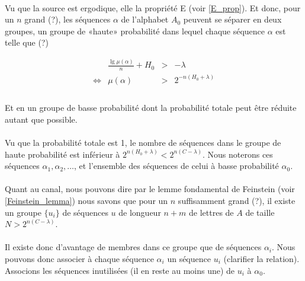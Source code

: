 \documentclass[a4paper,12pt]{article}
\begin{document}
	\paragraph{}
	Vu que la source est ergodique, elle la propriété E (voir \ref{E_prop}). Et donc, pour un $n$ grand (?), les séquences $\alpha$ de l'alphabet 
	$A_0$ peuvent se séparer en deux groupes, un groupe de «haute» probabilité dans lequel chaque séquence $\alpha$ est telle que (?)
	
	\[
		\begin{array}{crcl}
			&\frac{\lg \mu\left(\alpha\right)}{n}+H_0 &>& -\lambda\\
			\Leftrightarrow & \mu(\alpha) & > &2^{-n\left(H_0+\lambda\right)}\\
		\end{array}
	\]
	
	\paragraph{}
	Et en un groupe de basse probabilité dont la probabilité totale peut être réduite autant que possible.

	\paragraph{}
	Vu que la probabilité totale est 1, le nombre de séquences dans le groupe de haute probabilité est inférieur à $2^{n(H_0+\lambda)}<2^{n(C-\lambda)}$.
	Nous noterons ces séquences $\alpha_1,\alpha_2,\dots$, et l'ensemble des séquences de celui à basse probabilité $\alpha_0$.
	
	\paragraph{}
	Quant au canal, nous pouvons dire par le lemme fondamental de Feinstein (voir \ref{Feinstein_lemma}) nous savons que pour un $n$ suffisamment grand (?), 
	il existe un groupe $\{u_i\}$ de séquences $u$ de longueur $n+m$ de lettres de $A$ de taille $N > 2^{n(C-\lambda)}$.
	
	\paragraph{}
	Il existe donc d'avantage de membres dans ce groupe que de séquences $\alpha_i$. Nous pouvons donc associer à chaque séquence $\alpha_i$
	un séquence $u_i$ (clarifier la relation). Associons les séquences inutilisées (il en reste au moins une) de $u_i$ à $\alpha_0$.
	
\end{document}
